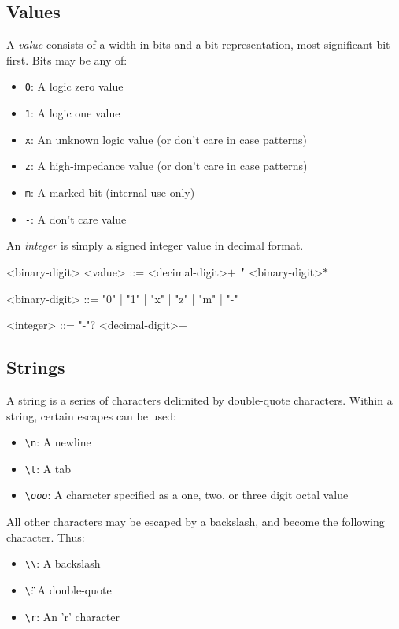 \subsection{Values}

A \textit{value} consists of a width in bits and a bit representation, most significant bit first. Bits may be any of:
\begin{itemize}
    \item \texttt{0}: A logic zero value
    \item \texttt{1}: A logic one value
    \item \texttt{x}: An unknown logic value (or don't care in case patterns)
    \item \texttt{z}: A high-impedance value (or don't care in case patterns)
    \item \texttt{m}: A marked bit (internal use only)
    \item \texttt{-}: A don't care value
\end{itemize}

An \textit{integer} is simply a signed integer value in decimal format.

\begin{indentgrammar}{<binary-digit>}
<value> ::= <decimal-digit>$+$ \texttt{\textbf{'}} <binary-digit>$*$

<binary-digit> ::= "0" | "1" | "x" | "z" | "m" | "-"

<integer> ::= "-"$?$ <decimal-digit>$+$
\end{indentgrammar}

\subsection{Strings}

A string is a series of characters delimited by double-quote characters. Within a string, certain escapes can be used:

\begin{itemize}
    \item \texttt{\textbackslash n}: A newline
    \item \texttt{\textbackslash t}: A tab
    \item \texttt{\textbackslash \textit{ooo}}: A character specified as a one, two, or three digit octal value
\end{itemize}

All other characters may be escaped by a backslash, and become the following character. Thus:

\begin{itemize}
    \item \texttt{\textbackslash \textbackslash}: A backslash
    \item \texttt{\textbackslash \"}: A double-quote
    \item \texttt{\textbackslash r}: An 'r' character
\end{itemize}

